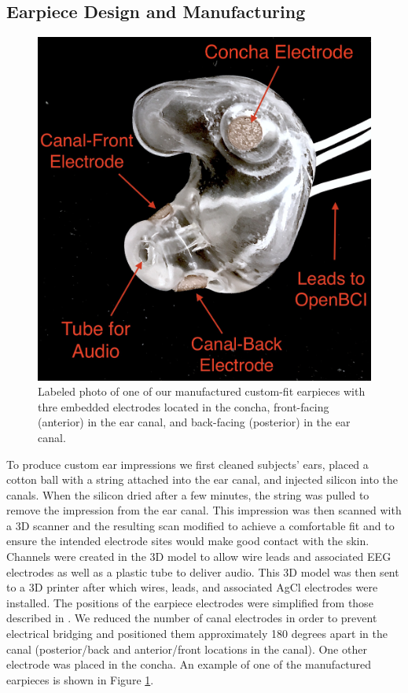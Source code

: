 \documentclass[a4paper,twoside]{article}
\begin{document}
\subsection{Earpiece Design and Manufacturing}

\begin{figure}[t]
\centering
\includegraphics[width=.75\linewidth]{./figures/CFEEEG_piecefig_Right.jpg}
\caption{Labeled photo of one of our manufactured custom-fit earpieces with thre embedded electrodes located in the concha, front-facing (anterior) in the ear canal, and back-facing (posterior) in the ear canal.}
\label{fig:earpiece_diagram}
\end{figure}

To produce custom ear impressions we first cleaned subjects' ears, placed a cotton ball with a string attached into the ear canal, and injected silicon into the canals. When the silicon dried after a few minutes, the string was pulled to remove the impression from the ear canal. This impression was then scanned with a 3D scanner and the resulting scan modified to achieve a comfortable fit and to ensure the intended electrode sites would make good contact with the skin. Channels were created in the 3D model to allow wire leads and associated EEG electrodes as well as a plastic tube to deliver audio. This 3D model was then sent to a 3D printer after which wires, leads, and associated AgCl electrodes were installed. The positions of the earpiece electrodes were simplified from those described in \cite{Mikkelsen2015}. We reduced the number of canal electrodes in order to prevent electrical bridging and positioned them approximately 180 degrees apart in the canal (posterior/back and anterior/front locations in the canal). One other electrode was placed in the concha. An example of one of the manufactured earpieces is shown in Figure \ref{fig:earpiece_diagram}.
\end{document}
